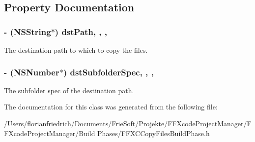 \subsection{Property Documentation}
\hypertarget{interface_f_f_x_c_copy_files_build_phase_a712285934a98e86197a5eb1580478798}{
\subsubsection[{dst\-Path}]{\setlength{\rightskip}{0pt plus 5cm}-\/ (N\-S\-String$\ast$) dst\-Path\hspace{0.3cm}{\ttfamily [read]}, {\ttfamily [write]}, {\ttfamily [nonatomic]}, {\ttfamily [strong]}}}\label{interface_f_f_x_c_copy_files_build_phase_a712285934a98e86197a5eb1580478798}
The destination path to which to copy the files. \hypertarget{interface_f_f_x_c_copy_files_build_phase_ad50ccf205b7197281d5c6716d7264cb4}{
\subsubsection[{dst\-Subfolder\-Spec}]{\setlength{\rightskip}{0pt plus 5cm}-\/ (N\-S\-Number$\ast$) dst\-Subfolder\-Spec\hspace{0.3cm}{\ttfamily [read]}, {\ttfamily [write]}, {\ttfamily [nonatomic]}, {\ttfamily [strong]}}}\label{interface_f_f_x_c_copy_files_build_phase_ad50ccf205b7197281d5c6716d7264cb4}
The subfolder spec of the destination path. 

The documentation for this class was generated from the following file\-:\begin{DoxyCompactItemize}
\item 
/\-Users/florianfriedrich/\-Documents/\-Frie\-Soft/\-Projekte/\-F\-F\-Xcode\-Project\-Manager/\-F\-F\-Xcode\-Project\-Manager/\-Build Phases/F\-F\-X\-C\-Copy\-Files\-Build\-Phase.\-h\end{DoxyCompactItemize}
